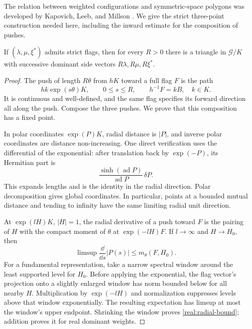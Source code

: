 The relation between weighted configurations and symmetric-space
polygons was developed by Kapovich, Leeb, and Millson
\cite[Section~5.3, Proposition~5.6]{KLM09}. We give the strict three-point construction
needed here, including the inward estimate for the composition of
pushes.

\begin{lemma}\label{real:triangles}
If $(\lambda,\mu,\xi^*)$ admits strict flags, then for every $R>0$
there is a triangle in $\mathcal G/K$ with successive dominant side
vectors $R\lambda,R\mu,R\xi^*$.
\end{lemma}

\begin{proof}
The push of length $R\theta$ from $hK$ toward a full flag $F$ is the
path
\[
 hk\exp(s\theta)K,\qquad 0\le s\le R,
 \qquad h^{-1}F=kB,\quad k\in K.
\]
It is continuous and well-defined, and the same flag specifies its
forward direction all along the push.  Compose the three pushes.
We prove that this composition has a fixed point.

In polar coordinates $\exp(P)K$, radial distance is $|P|$, and inverse
polar coordinates are distance non-increasing.  One direct verification
uses the differential of the exponential: after translation back by
$\exp(-P)$, its Hermitian part is
\[
 \frac{\sinh(\operatorname{ad}P)}{\operatorname{ad}P}\,\delta P.
\]
This expands lengths and is the identity in the radial direction.
Polar decomposition gives global coordinates.  In particular, points
at a bounded mutual distance and tending to infinity have the same
limiting radial unit direction.

At $\exp(lH)K$, $|H|=1$, the radial derivative of a push toward $F$
is the pairing of $H$ with the compact moment of $\theta$ at
$\exp(-lH)F$.  If $l\to\infty$ and $H\to H_0$, then
\begin{equation}\label{real:radial-bound}
 \limsup \frac{\dd}{\dd s}|P(s)|
 \le m_\theta(F,H_0).
\end{equation}
For a fundamental representation, take a narrow spectral window
around the least supported level for $H_0$.  Before applying the
exponential, the flag vector's projection onto a slightly enlarged
window has norm bounded below for all nearby $H$.  Multiplication
by $\exp(-lH)$ and normalization suppresses levels above that window
exponentially.  The resulting expectation has limsup at most the
window's upper endpoint.  Shrinking the window proves
\eqref{real:radial-bound}; addition proves it for real dominant
weights.


\end{proof}
